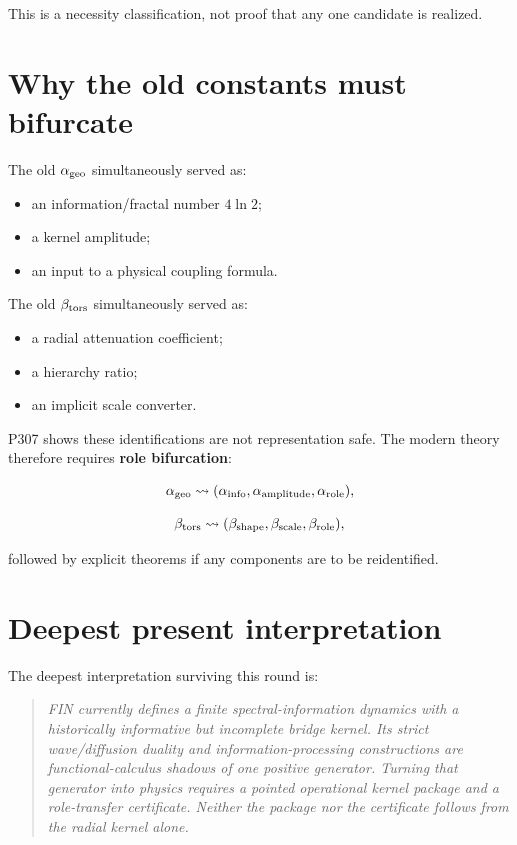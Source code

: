 \documentclass[11pt,a4paper,openany]{report}
\begin{document}
This is a necessity classification, not proof that any one candidate is realized.

\section{Why the old constants must bifurcate}

The old \(\alpha_{\rm geo}\) simultaneously served as:

\begin{itemize}
\item 
an information/\allowbreak{}fractal number \(4\ln2\);

\item 
a kernel amplitude;

\item 
an input to a physical coupling formula.

\end{itemize}

The old \(\beta_{\rm tors}\) simultaneously served as:

\begin{itemize}
\item 
a radial attenuation coefficient;

\item 
a hierarchy ratio;

\item 
an implicit scale converter.

\end{itemize}

P307 shows these identifications are not representation safe. The modern theory therefore requires \textbf{role bifurcation}:

\[
\alpha_{\rm geo}
\rightsquigarrow
(\alpha_{\rm info},\alpha_{\rm amplitude},\alpha_{\rm role}),
\]

\[
\beta_{\rm tors}
\rightsquigarrow
(\beta_{\rm shape},\beta_{\rm scale},\beta_{\rm role}),
\]

followed by explicit theorems if any components are to be reidentified.

\section{Deepest present interpretation}

The deepest interpretation surviving this round is:

\begin{quote}\itshape
FIN currently defines a finite spectral-information dynamics with a historically informative but incomplete bridge kernel. Its strict wave/\allowbreak{}diffusion duality and information-processing constructions are functional-calculus shadows of one positive generator. Turning that generator into physics requires a pointed operational kernel package and a role-transfer certificate. Neither the package nor the certificate follows from the radial kernel alone.

\end{quote}
\end{document}
